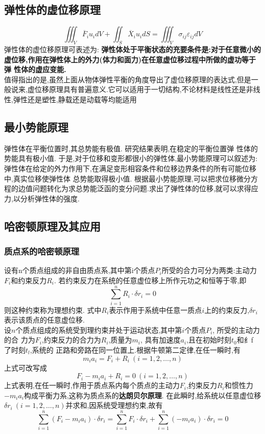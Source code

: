 \documentclass{book}
\begin{document}
\subsection{弹性体的虚位移原理}
\begin{equation}
 \iiint_V \overline{F}_i u_i dV + \iint_S \overline{X}_i u_i dS = \iiint_V \sigma_{ij} \varepsilon_{ij} dV
\end{equation}
弹性体的虚位移原理可表述为:
\textbf{弹性体处于平衡状态的充要条件是:对于任意微小的虚位移,作用在弹性体上的外力(体力和面力)在任意虚位移过程中所做的虚功等于弹
性体的虚应变能.}
\\
值得指出的是,虽然上面从物体弹性平衡的角度导出了虚位移原理的表达式,但是一般说来,虚位移原理具有普遍意义.它可以适用于一切结构,不论材料是线性还是非线性,弹性还是塑性,静载还是动载等均能适用

\subsection{最小势能原理}
弹性体在平衡位置时,其总势能有极值.
研究结果表明,在稳定的平衡位置弹 性体的势能具有极小值.
于是,对于位移和变形都很小的弹性体,最小势能原理可以叙述为:
弹性体在给定的外力作用下,在满足变形相容条件和位移边界条件的所有可能位移中,真实位移使弹性体 总势能取得极小值.
根据最小势能原理,可以把求位移微分方程的边值问题转化为求总势能泛函的变分问题.求出了弹性体的位移,就可以求得应力,以分析弹性体的强度.

\subsection{哈密顿原理及其应用}
\subsubsection{质点系的哈密顿原理}
设有n个质点组成的非自由质点系,其中第i个质点$P_i$所受的合力可分为两类:主动力$F_i$和约束反力$R_i$. 若约束反力在系统的任意虚位移上所作元功之和恒等于零,即
\begin{equation}
\sum_{i=1}^n R_i \cdot \delta r_i =0
\end{equation}
则这种约束称为理想约束. 式中$R_i$表示作用于系统中任意一质点$i$上的约束反力,$\delta r_i$表示该质点的任意虚位移.  \\
设$n$个质点组成的系统受到理约束并处于运动状态,其中第$i$个质点$P_i$, 所受的主动力的合 力为$F_i$,约束反力的合力为$R_i$,质量为$m_i$,
具有加速度$a_i$,且在初始时刻$t_0$和纟f 了时刻$t_l$,系统的 正路和旁路在同一位置上.根据牛顿第二定律,在任一瞬时,有
\begin{equation}
 m_i a_i = F_i + R_i  ~(i=1,2,\ldots,n)
\end{equation}
上式可改写成
\begin{equation}
   F_i- m_i a_i + R_i =0 ~(i=1,2,\ldots,n)
\end{equation}
上式表明,在任一瞬时,作用于质点系内每个质点的主动力$F_i$,约束反力$R_i$和惯性力$-m_ia_i$构成平衡力系,这称为质点系的\textbf{达朗贝尔原理}.
在此瞬时,给系统以任意虚位移$\delta r_i ~ (i=1,2,\ldots,n)$并求和,因系统受理想约束,故有
\begin{equation}
 \sum_{i=1}^n(F_i - m_i a_i)\cdot \delta r_i =\sum_{i=1}^nF_i \cdot \delta r_i +\sum_{i=1}^n(- m_i a_i)\cdot \delta r_i=0
 \label{equation.dynamic.general}
\end{equation}
\end{document}
